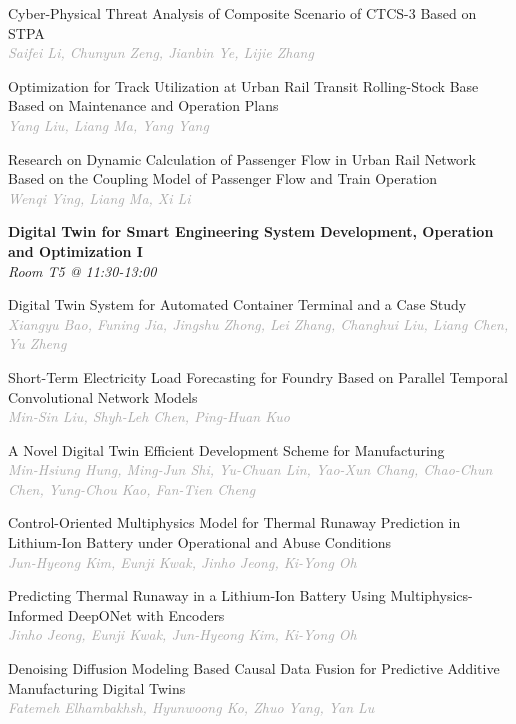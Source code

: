 \begin{multicols*}{2}
\small Cyber-Physical Threat Analysis of Composite Scenario of CTCS-3 Based on STPA\\ 
\footnotesize \textcolor{darkgray}{\textit{Saifei Li, Chunyun  Zeng, Jianbin  Ye, Lijie  Zhang}}

\small Optimization for Track Utilization at Urban Rail Transit Rolling-Stock Base Based on Maintenance and Operation Plans\\ 
\footnotesize \textcolor{darkgray}{\textit{Yang Liu, Liang  Ma, Yang  Yang}}

\small Research on Dynamic Calculation of Passenger Flow in Urban Rail Network Based on the Coupling Model of Passenger Flow and Train Operation\\ 
\footnotesize \textcolor{darkgray}{\textit{Wenqi Ying, Liang  Ma, Xi  Li}}

\normalsize \textbf{Digital Twin for Smart Engineering System Development, Operation and Optimization I}\\
\small \textit{Room T5 @ 11:30-13:00}

\small Digital Twin System for Automated Container Terminal and a Case Study\\ 
\footnotesize \textcolor{darkgray}{\textit{Xiangyu Bao, Funing  Jia, Jingshu  Zhong, Lei  Zhang, Changhui  Liu, Liang  Chen, Yu  Zheng}}

\small Short-Term Electricity Load Forecasting for Foundry Based on Parallel Temporal Convolutional Network Models\\ 
\footnotesize \textcolor{darkgray}{\textit{Min-Sin Liu, Shyh-Leh  Chen, Ping-Huan  Kuo}}

\small A Novel Digital Twin Efficient Development Scheme for Manufacturing\\ 
\footnotesize \textcolor{darkgray}{\textit{Min-Hsiung Hung, Ming-Jun  Shi, Yu-Chuan  Lin, Yao-Xun  Chang, Chao-Chun  Chen, Yung-Chou  Kao, Fan-Tien  Cheng}}

\small Control-Oriented Multiphysics Model for Thermal Runaway Prediction in Lithium-Ion Battery under Operational and Abuse Conditions\\ 
\footnotesize \textcolor{darkgray}{\textit{Jun-Hyeong Kim, Eunji  Kwak, Jinho  Jeong, Ki-Yong  Oh}}

\small Predicting Thermal Runaway in a Lithium-Ion Battery Using Multiphysics-Informed DeepONet with Encoders\\ 
\footnotesize \textcolor{darkgray}{\textit{Jinho Jeong, Eunji  Kwak, Jun-Hyeong  Kim, Ki-Yong  Oh}}

\small Denoising Diffusion Modeling Based Causal Data Fusion for Predictive Additive Manufacturing Digital Twins\\ 
\footnotesize \textcolor{darkgray}{\textit{Fatemeh Elhambakhsh, Hyunwoong  Ko, Zhuo  Yang, Yan  Lu}}


\end{multicols*}
